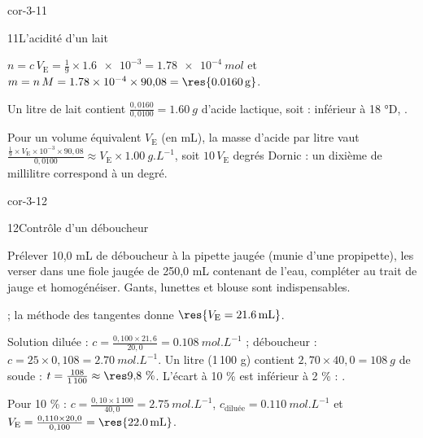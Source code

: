 \begin{blocLivre}{cor-3-11}
\begin{corrige}{11}{L'acidité d'un lait}
\begin{questions}
\item $n=c\,V_\mathrm{E}=\frac19\times\num{1.6e-3}=\qty{1,78e-4}{mol}$ et $m=n\,M=\num{1.78e-4}\times90{,}08=\res{\qty{0,0160}{g}}$.
\item Un litre de lait contient $\frac{0{,}0160}{0{,}0100}=\qty{1,60}{g}$ d'acide lactique, soit  :
inférieur à 18 °D, .
\item Pour un volume équivalent $V_\mathrm{E}$ (en mL), la masse d'acide par litre vaut
$\frac{\frac19\times V_\mathrm{E}\times10^{-3}\times90{,}08}{0{,}0100}\approx V_\mathrm{E}\times\qty{1,00}{g.L^{-1}}$,
soit $10\,V_\mathrm{E}$ degrés Dornic : un dixième de millilitre correspond à un degré.
\end{questions}
\end{corrige}
\end{blocLivre}
\begin{blocLivre}{cor-3-12}
\begin{corrige}{12}{Contrôle d'un déboucheur}
\begin{questions}
\item Prélever 10,0 mL de déboucheur à la pipette jaugée (munie d'une propipette), les verser dans une fiole jaugée de
250,0 mL contenant de l'eau, compléter au trait de jauge et homogénéiser. Gants, lunettes et blouse sont indispensables.
\item {} ; la méthode des tangentes donne $\res{V_\mathrm{E}=\qty{21,6}{mL}}$.
\item Solution diluée : $c=\frac{0{,}100\times21{,}6}{20{,}0}=\qty{0,108}{mol.L^{-1}}$ ; déboucheur :
$c=25\times0{,}108=\qty{2,70}{mol.L^{-1}}$. Un litre (1\,100 g) contient $2{,}70\times40{,}0=\qty{108}{g}$ de soude :
$t=\frac{108}{1\,100}\approx\res{9{,}8~\%}$. L'écart à 10 \% est inférieur à 2 \% : .
\item Pour 10 \% : $c=\frac{0{,}10\times1\,100}{40{,}0}=\qty{2,75}{mol.L^{-1}}$, $c_\text{diluée}=\qty{0,110}{mol.L^{-1}}$ et
$V_\mathrm{E}=\frac{0{,}110\times20{,}0}{0{,}100}=\res{\qty{22,0}{mL}}$.
\end{questions}
\end{corrige}
\end{blocLivre}
